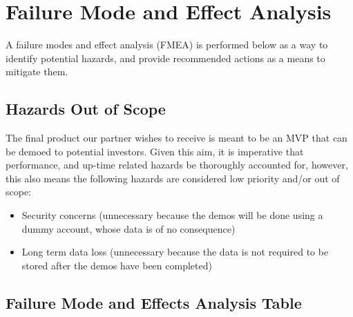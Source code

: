 \documentclass{article}
\begin{document}
\section{Failure Mode and Effect Analysis}

A failure modes and effect analysis (FMEA) is performed below as a way to identify potential hazards, and provide recommended actions as a means to mitigate them.

\subsection{Hazards Out of Scope}

The final product our partner wishes to receive is meant to be an MVP that can be demoed to potential investors. Given this aim, it is imperative that performance, and up-time related hazards be thoroughly accounted for, however, this also means the following hazards are considered low priority and/or out of scope:

\begin{itemize}
    \item Security concerns (unnecessary because the demos will be done using a dummy account, whose data is of no consequence)
    \item Long term data loss (unnecessary because the data is not required to be stored after the demos have been completed)
\end{itemize}

\subsection{Failure Mode and Effects Analysis Table}
\end{document}
